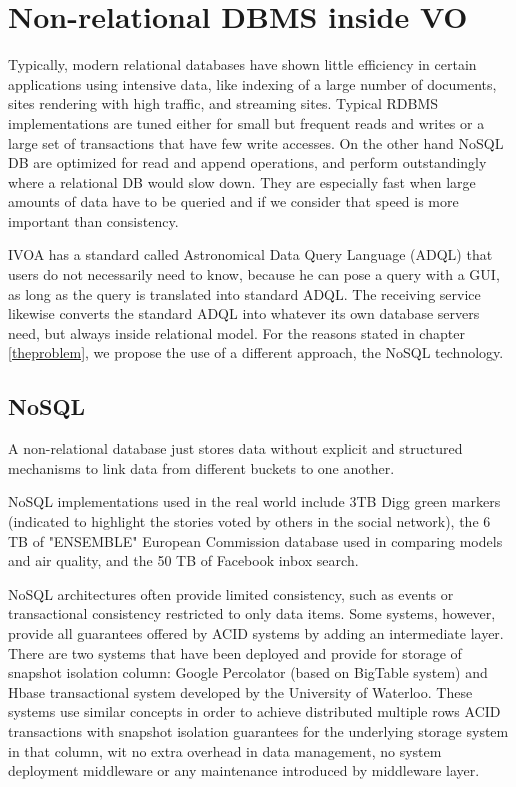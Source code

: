 \chapter{Non-relational DBMS inside VO}

Typically, modern relational databases have shown little efficiency in certain applications using intensive data, like indexing of a large number of documents, sites rendering with high traffic, and streaming sites. Typical RDBMS implementations are tuned either for small but frequent reads and writes or a large set of transactions that have few write accesses. On the other hand NoSQL DB are optimized for read and append operations, and perform outstandingly where a relational DB would slow down. They are especially fast when large amounts of data have to be queried and if we consider that speed is more important than consistency. 

IVOA has a standard called Astronomical Data Query Language (ADQL) that users do not necessarily need to know, because he can pose a query with a GUI, as long as the query is translated into standard ADQL. The receiving service likewise converts the standard ADQL into whatever its own database servers need, but always inside relational model. For the reasons stated in chapter \ref{theproblem}, we propose the use of a different approach, the NoSQL technology.


\section{NoSQL}

A non-relational database just stores data without explicit and structured mechanisms to link data from different buckets to one another. 

NoSQL implementations used in the real world include 3TB Digg green markers (indicated to highlight the stories voted by others in the social network), the 6 TB of "ENSEMBLE" European Commission database used in comparing models and air quality, and the 50 TB of Facebook inbox search. 

NoSQL architectures often provide limited consistency, such as events or transactional consistency restricted to only data items. Some systems, however, provide all guarantees offered by ACID systems by adding an intermediate layer. There are two systems that have been deployed and provide for storage of snapshot isolation column: Google Percolator (based on BigTable system) and Hbase transactional system developed by the University of Waterloo. These systems use similar concepts in order to achieve distributed multiple rows ACID transactions with snapshot isolation guarantees for the underlying storage system in that column, wit no extra overhead in data management, no system deployment middleware or any maintenance introduced by middleware layer. 

